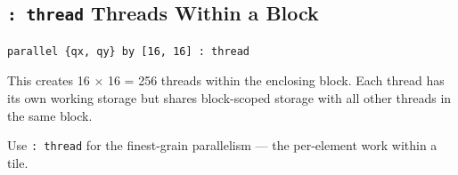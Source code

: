 \subsection*{\texttt{: thread} Threads Within a Block}

\begin{lstlisting}[language=croqtile,caption={: thread --- Threads Within a Block}]
parallel {qx, qy} by [16, 16] : thread
\end{lstlisting}

This creates 16 \(\times\) 16 = 256 threads within the enclosing block. Each thread has its own working storage but shares block-scoped storage with all other threads in the same block.

Use \texttt{: thread} for the finest-grain parallelism --- the per-element work within a tile.
